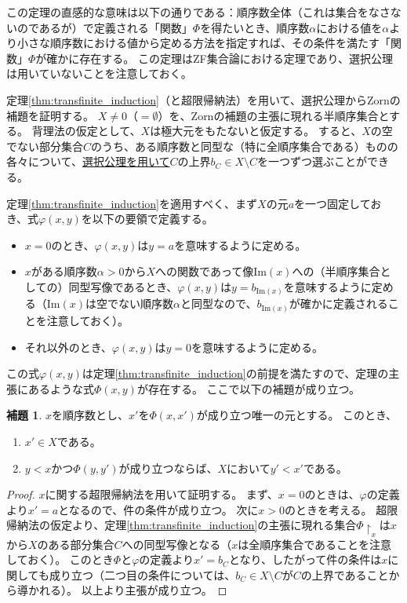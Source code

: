 ﻿\documentclass{ltjsarticle}
\theoremstyle{definition}
\newtheorem{lemma}{補題}
\begin{document}
この定理の直感的な意味は以下の通りである：順序数全体（これは集合をなさないのであるが）で定義される「関数」$\Phi$を得たいとき、順序数$\alpha$における値を$\alpha$より小さな順序数における値から定める方法を指定すれば、その条件を満たす「関数」$\Phi$が確かに存在する。
この定理はZF集合論における定理であり、選択公理は用いていないことを注意しておく。

定理\ref{thm:transfinite_induction}（と超限帰納法）を用いて、選択公理からZornの補題を証明する。
$X \neq 0$（$= \emptyset$）を、Zornの補題の主張に現れる半順序集合とする。
背理法の仮定として、$X$は極大元をもたないと仮定する。
すると、$X$の空でない部分集合$C$のうち、ある順序数と同型な（特に全順序集合である）ものの各々について、\underline{選択公理を用いて}$C$の上界$b_C \in X \setminus C$を一つずつ選ぶことができる。

定理\ref{thm:transfinite_induction}を適用すべく、まず$X$の元$a$を一つ固定しておき、式$\varphi(x,y)$を以下の要領で定義する。
\begin{itemize}
    \item $x = 0$のとき、$\varphi(x,y)$は$y = a$を意味するように定める。
    \item $x$がある順序数$\alpha > 0$から$X$への関数であって像$\mathrm{Im}(x)$への（半順序集合としての）同型写像であるとき、$\varphi(x,y)$は$y = b_{\mathrm{Im}(x)}$を意味するように定める（$\mathrm{Im}(x)$は空でない順序数$\alpha$と同型なので、$b_{\mathrm{Im}(x)}$が確かに定義されることを注意しておく）。
    \item それ以外のとき、$\varphi(x,y)$は$y = 0$を意味するように定める。
\end{itemize}
この式$\varphi(x,y)$は定理\ref{thm:transfinite_induction}の前提を満たすので、定理の主張にあるような式$\Phi(x,y)$が存在する。
ここで以下の補題が成り立つ。

\begin{lemma}
    \label{lem:appendix_property_of_Phi}
    $x$を順序数とし、$x'$を$\Phi(x,x')$が成り立つ唯一の元とする。
    このとき、
    \begin{enumerate}
        \item $x' \in X$である。
        \item $y < x$かつ$\Phi(y,y')$が成り立つならば、$X$において$y' < x'$である。
    \end{enumerate}
\end{lemma}
\begin{proof}
    $x$に関する超限帰納法を用いて証明する。
    まず、$x = 0$のときは、$\varphi$の定義より$x' = a$となるので、件の条件が成り立つ。
    次に$x > 0$のときを考える。
    超限帰納法の仮定より、定理\ref{thm:transfinite_induction}の主張に現れる集合$\Phi\!\upharpoonright_x$は$x$から$X$のある部分集合$C$への同型写像となる（$x$は全順序集合であることを注意しておく）。
    このとき$\Phi$と$\varphi$の定義より$x' = b_C$となり、したがって件の条件は$x$に関しても成り立つ（二つ目の条件については、$b_C \in X \setminus C$が$C$の上界であることから導かれる）。
    以上より主張が成り立つ。
\end{proof}
\end{document}
